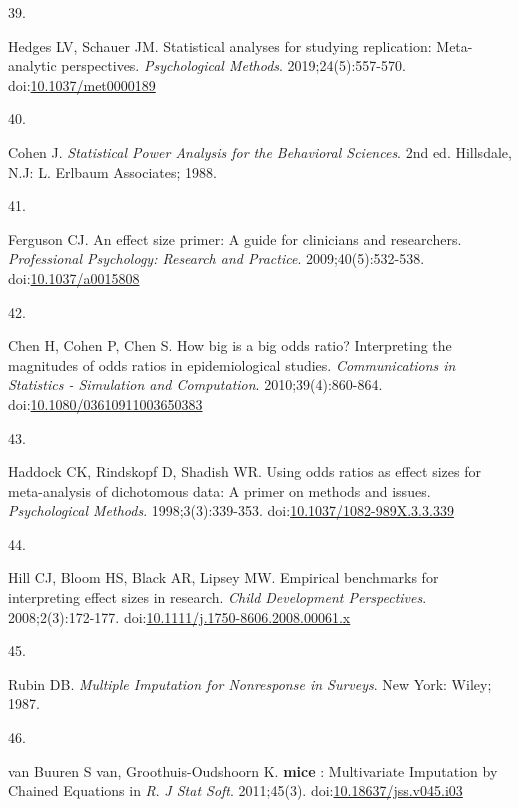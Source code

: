 \documentclass[
]{article}
\newlength{\cslhangindent}
\newlength{\csllabelwidth}
\newlength{\cslentryspacingunit} %
\newenvironment{CSLReferences}[2] %
 {%
  \setlength{\parindent}{0pt}
  \ifodd #1
  \let\oldpar\par
  \def\par{\hangindent=\cslhangindent\oldpar}
  \fi
  \setlength{\parskip}{#2\cslentryspacingunit}
 }%
 {}
\newcommand{\CSLLeftMargin}[1]{\parbox[t]{\csllabelwidth}{#1}}
\newcommand{\CSLRightInline}[1]{\parbox[t]{\linewidth - \csllabelwidth}{#1}\break}
\begin{document}
\begin{CSLReferences}{0}{0}
\leavevmode{}%
\CSLLeftMargin{39. }
\CSLRightInline{Hedges LV, Schauer JM. Statistical analyses for studying replication: Meta-analytic perspectives. \emph{Psychological Methods}. 2019;24(5):557-570. doi:\href{https://doi.org/10.1037/met0000189}{10.1037/met0000189}}

\leavevmode{}%
\CSLLeftMargin{40. }
\CSLRightInline{Cohen J. \emph{Statistical Power Analysis for the Behavioral Sciences}. 2nd ed. Hillsdale, N.J: L. Erlbaum Associates; 1988.}

\leavevmode{}%
\CSLLeftMargin{41. }
\CSLRightInline{Ferguson CJ. An effect size primer: A guide for clinicians and researchers. \emph{Professional Psychology: Research and Practice}. 2009;40(5):532-538. doi:\href{https://doi.org/10.1037/a0015808}{10.1037/a0015808}}

\leavevmode{}%
\CSLLeftMargin{42. }
\CSLRightInline{Chen H, Cohen P, Chen S. How big is a big odds ratio? Interpreting the magnitudes of odds ratios in epidemiological studies. \emph{Communications in Statistics - Simulation and Computation}. 2010;39(4):860-864. doi:\href{https://doi.org/10.1080/03610911003650383}{10.1080/03610911003650383}}

\leavevmode{}%
\CSLLeftMargin{43. }
\CSLRightInline{Haddock CK, Rindskopf D, Shadish WR. Using odds ratios as effect sizes for meta-analysis of dichotomous data: A primer on methods and issues. \emph{Psychological Methods}. 1998;3(3):339-353. doi:\href{https://doi.org/10.1037/1082-989X.3.3.339}{10.1037/1082-989X.3.3.339}}

\leavevmode{}%
\CSLLeftMargin{44. }
\CSLRightInline{Hill CJ, Bloom HS, Black AR, Lipsey MW. Empirical benchmarks for interpreting effect sizes in research. \emph{Child Development Perspectives}. 2008;2(3):172-177. doi:\href{https://doi.org/10.1111/j.1750-8606.2008.00061.x}{10.1111/j.1750-8606.2008.00061.x}}

\leavevmode{}%
\CSLLeftMargin{45. }
\CSLRightInline{Rubin DB. \emph{Multiple Imputation for Nonresponse in Surveys}. New York: Wiley; 1987.}

\leavevmode{}%
\CSLLeftMargin{46. }
\CSLRightInline{van Buuren S van, Groothuis-Oudshoorn K. \textbf{mice} : Multivariate Imputation by Chained Equations in \emph{R}. \emph{J Stat Soft}. 2011;45(3). doi:\href{https://doi.org/10.18637/jss.v045.i03}{10.18637/jss.v045.i03}}


\end{CSLReferences}
\end{document}
